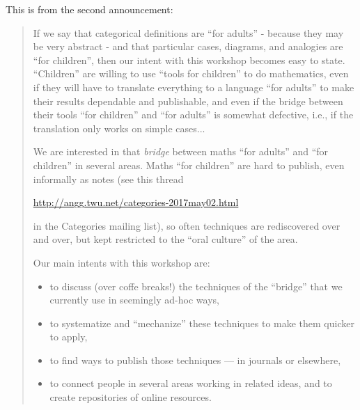 \documentclass[oneside,12pt]{article}
\begin{document}
This is from the second announcement:

\begin{quotation}

  If we say that categorical definitions are ``for adults'' - because
  they may be very abstract - and that particular cases, diagrams, and
  analogies are ``for children'', then our intent with this workshop
  becomes easy to state. ``Children'' are willing to use ``tools for
  children'' to do mathematics, even if they will have to translate
  everything to a language ``for adults'' to make their results
  dependable and publishable, and even if the bridge between their
  tools ``for children'' and ``for adults'' is somewhat defective,
  i.e., if the translation only works on simple cases...

  We are interested in that {\sl bridge} between maths ``for adults''
  and ``for children'' in several areas. Maths ``for children'' are
  hard to publish, even informally as notes (see this thread

  \msk

  \centerline{\url{http://angg.twu.net/categories-2017may02.html}}

  \msk

  \noindent in the Categories mailing list), so often techniques are
  rediscovered over and over, but kept restricted to the ``oral
  culture'' of the area.

  Our main intents with this workshop are:

  \begin{itemize}

     \item to discuss (over coffe breaks!) the techniques of the
       ``bridge'' that we currently use in seemingly ad-hoc ways,

     \item to systematize and ``mechanize'' these techniques to make
       them quicker to apply,

     \item to find ways to publish those techniques --- in journals or
       elsewhere,

     \item to connect people in several areas working in related
       ideas, and to create repositories of online resources.

  \end{itemize}

\end{quotation}
\end{document}
